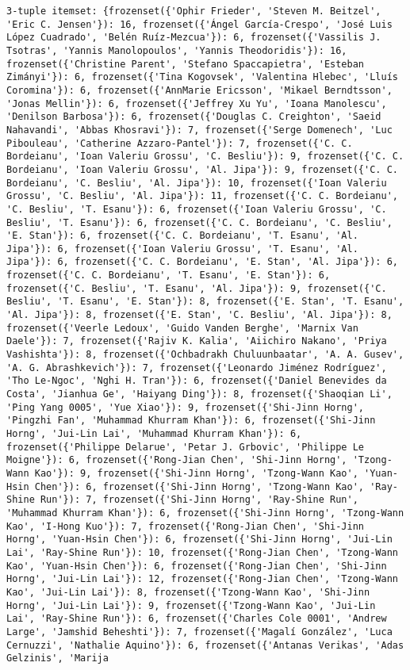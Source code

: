 \documentclass[11pt]{article}
\begin{document}
\begin{verbatim}
3-tuple itemset: {frozenset({'Ophir Frieder', 'Steven M. Beitzel', 'Eric C. Jensen'}): 16, frozenset({'Ángel García-Crespo', 'José Luis López Cuadrado', 'Belén Ruíz-Mezcua'}): 6, frozenset({'Vassilis J. Tsotras', 'Yannis Manolopoulos', 'Yannis Theodoridis'}): 16, frozenset({'Christine Parent', 'Stefano Spaccapietra', 'Esteban Zimányi'}): 6, frozenset({'Tina Kogovsek', 'Valentina Hlebec', 'Lluís Coromina'}): 6, frozenset({'AnnMarie Ericsson', 'Mikael Berndtsson', 'Jonas Mellin'}): 6, frozenset({'Jeffrey Xu Yu', 'Ioana Manolescu', 'Denilson Barbosa'}): 6, frozenset({'Douglas C. Creighton', 'Saeid Nahavandi', 'Abbas Khosravi'}): 7, frozenset({'Serge Domenech', 'Luc Pibouleau', 'Catherine Azzaro-Pantel'}): 7, frozenset({'C. C. Bordeianu', 'Ioan Valeriu Grossu', 'C. Besliu'}): 9, frozenset({'C. C. Bordeianu', 'Ioan Valeriu Grossu', 'Al. Jipa'}): 9, frozenset({'C. C. Bordeianu', 'C. Besliu', 'Al. Jipa'}): 10, frozenset({'Ioan Valeriu Grossu', 'C. Besliu', 'Al. Jipa'}): 11, frozenset({'C. C. Bordeianu', 'C. Besliu', 'T. Esanu'}): 6, frozenset({'Ioan Valeriu Grossu', 'C. Besliu', 'T. Esanu'}): 6, frozenset({'C. C. Bordeianu', 'C. Besliu', 'E. Stan'}): 6, frozenset({'C. C. Bordeianu', 'T. Esanu', 'Al. Jipa'}): 6, frozenset({'Ioan Valeriu Grossu', 'T. Esanu', 'Al. Jipa'}): 6, frozenset({'C. C. Bordeianu', 'E. Stan', 'Al. Jipa'}): 6, frozenset({'C. C. Bordeianu', 'T. Esanu', 'E. Stan'}): 6, frozenset({'C. Besliu', 'T. Esanu', 'Al. Jipa'}): 9, frozenset({'C. Besliu', 'T. Esanu', 'E. Stan'}): 8, frozenset({'E. Stan', 'T. Esanu', 'Al. Jipa'}): 8, frozenset({'E. Stan', 'C. Besliu', 'Al. Jipa'}): 8, frozenset({'Veerle Ledoux', 'Guido Vanden Berghe', 'Marnix Van Daele'}): 7, frozenset({'Rajiv K. Kalia', 'Aiichiro Nakano', 'Priya Vashishta'}): 8, frozenset({'Ochbadrakh Chuluunbaatar', 'A. A. Gusev', 'A. G. Abrashkevich'}): 7, frozenset({'Leonardo Jiménez Rodríguez', 'Tho Le-Ngoc', 'Nghi H. Tran'}): 6, frozenset({'Daniel Benevides da Costa', 'Jianhua Ge', 'Haiyang Ding'}): 8, frozenset({'Shaoqian Li', 'Ping Yang 0005', 'Yue Xiao'}): 9, frozenset({'Shi-Jinn Horng', 'Pingzhi Fan', 'Muhammad Khurram Khan'}): 6, frozenset({'Shi-Jinn Horng', 'Jui-Lin Lai', 'Muhammad Khurram Khan'}): 6, frozenset({'Philippe Delarue', 'Petar J. Grbovic', 'Philippe Le Moigne'}): 6, frozenset({'Rong-Jian Chen', 'Shi-Jinn Horng', 'Tzong-Wann Kao'}): 9, frozenset({'Shi-Jinn Horng', 'Tzong-Wann Kao', 'Yuan-Hsin Chen'}): 6, frozenset({'Shi-Jinn Horng', 'Tzong-Wann Kao', 'Ray-Shine Run'}): 7, frozenset({'Shi-Jinn Horng', 'Ray-Shine Run', 'Muhammad Khurram Khan'}): 6, frozenset({'Shi-Jinn Horng', 'Tzong-Wann Kao', 'I-Hong Kuo'}): 7, frozenset({'Rong-Jian Chen', 'Shi-Jinn Horng', 'Yuan-Hsin Chen'}): 6, frozenset({'Shi-Jinn Horng', 'Jui-Lin Lai', 'Ray-Shine Run'}): 10, frozenset({'Rong-Jian Chen', 'Tzong-Wann Kao', 'Yuan-Hsin Chen'}): 6, frozenset({'Rong-Jian Chen', 'Shi-Jinn Horng', 'Jui-Lin Lai'}): 12, frozenset({'Rong-Jian Chen', 'Tzong-Wann Kao', 'Jui-Lin Lai'}): 8, frozenset({'Tzong-Wann Kao', 'Shi-Jinn Horng', 'Jui-Lin Lai'}): 9, frozenset({'Tzong-Wann Kao', 'Jui-Lin Lai', 'Ray-Shine Run'}): 6, frozenset({'Charles Cole 0001', 'Andrew Large', 'Jamshid Beheshti'}): 7, frozenset({'Magalí González', 'Luca Cernuzzi', 'Nathalie Aquino'}): 6, frozenset({'Antanas Verikas', 'Adas Gelzinis', 'Marija 
\end{verbatim}
\end{document}
